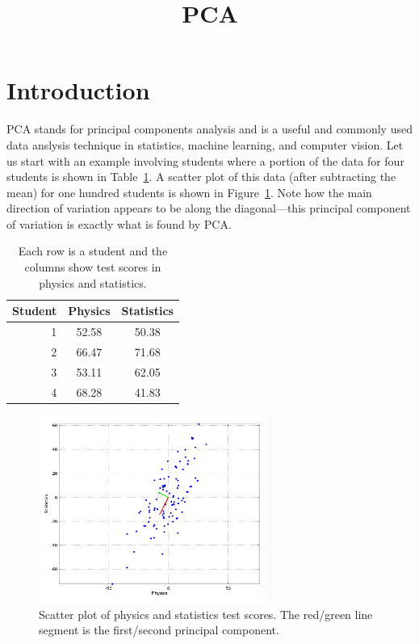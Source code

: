 \documentclass{article}
\begin{document}
\title{PCA}
\author{}
\date{}
\maketitle

\section{Introduction}

PCA stands for principal components analysis and is a useful and commonly used data anslysis technique in statistics, machine learning, and computer vision.  Let us start with an example involving students where a portion of the data for four students is shown in Table~\ref{tab:students}.  A scatter plot of this data (after subtracting the mean) for one hundred students is shown in Figure~\ref{fig:students}.  Note how the main direction of variation appears to be along the diagonal---this principal component of variation is exactly what is found by PCA.

\begin{table}
\centering
\begin{tabular}{rcc}
Student & Physics & Statistics \\
\hline
1 & 52.58 & 50.38 \\
2 & 66.47 & 71.68 \\
3 & 53.11 & 62.05 \\
4 & 68.28 & 41.83 \\
\end{tabular}
\caption{Each row is a student and the columns show test scores in physics and statistics.}
\label{tab:students}
\end{table}

\begin{figure}
\centering
\includegraphics[width=3in]{physicsStatistics.png}
\caption{Scatter plot of physics and statistics test scores.  The red/green line segment is the first/second principal component.}
\label{fig:students}
\end{figure}
\end{document}
